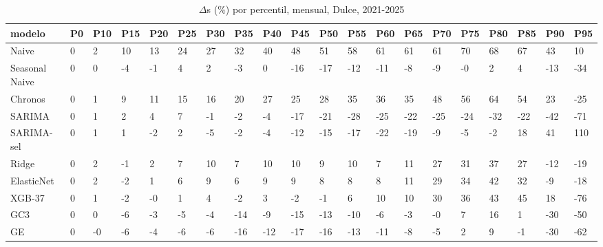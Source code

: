 \begin{table}[H]
\centering
\small
\caption{$\Delta$s (\%) por percentil, mensual, Dulce, 2021-2025}
\label{tab:T_barrido_delta_s_mensual_dulce}
\begin{tabular}{llllllllllllllllllll}
\toprule
modelo & P0 & P10 & P15 & P20 & P25 & P30 & P35 & P40 & P45 & P50 & P55 & P60 & P65 & P70 & P75 & P80 & P85 & P90 & P95 \\
\midrule
Naive & 0 & 2 & 10 & 13 & 24 & 27 & 32 & 40 & 48 & 51 & 58 & 61 & 61 & 61 & 70 & 68 & 67 & 43 & 10 \\
Seasonal Naive & 0 & 0 & -4 & -1 & 4 & 2 & -3 & 0 & -16 & -17 & -12 & -11 & -8 & -9 & -0 & 2 & 4 & -13 & -34 \\
Chronos & 0 & 1 & 9 & 11 & 15 & 16 & 20 & 27 & 25 & 28 & 35 & 36 & 35 & 48 & 56 & 64 & 54 & 23 & -25 \\
SARIMA & 0 & 1 & 2 & 4 & 7 & -1 & -2 & -4 & -17 & -21 & -28 & -25 & -22 & -25 & -24 & -32 & -22 & -42 & -71 \\
SARIMA-sel & 0 & 1 & 1 & -2 & 2 & -5 & -2 & -4 & -12 & -15 & -17 & -22 & -19 & -9 & -5 & -2 & 18 & 41 & 110 \\
Ridge & 0 & 2 & -1 & 2 & 7 & 10 & 7 & 10 & 10 & 9 & 10 & 7 & 11 & 27 & 31 & 37 & 27 & -12 & -19 \\
ElasticNet & 0 & 2 & -2 & 1 & 6 & 9 & 6 & 9 & 9 & 8 & 8 & 8 & 11 & 29 & 34 & 42 & 32 & -9 & -18 \\
XGB-37 & 0 & 1 & -2 & -0 & 1 & 4 & -2 & 3 & -2 & -1 & 6 & 10 & 10 & 30 & 36 & 43 & 45 & 18 & -76 \\
GC3 & 0 & 0 & -6 & -3 & -5 & -4 & -14 & -9 & -15 & -13 & -10 & -6 & -3 & -0 & 7 & 16 & 1 & -30 & -50 \\
GE & 0 & -0 & -6 & -4 & -6 & -6 & -16 & -12 & -17 & -16 & -13 & -11 & -8 & -5 & 2 & 9 & -1 & -30 & -62 \\
\bottomrule
\end{tabular}
\end{table}